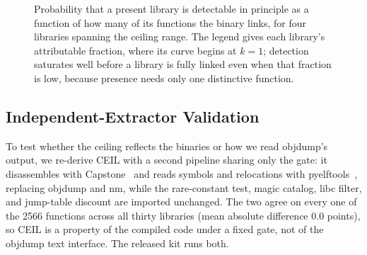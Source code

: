 \documentclass[conference]{IEEEtran}
\begin{document}
\begin{figure}[t]
\centering
{}
\caption{Probability that a present library is detectable in principle as a function
of how many of its functions the binary links, for four libraries spanning the ceiling
range. The legend gives each library's attributable fraction, where its curve begins
at $k=1$; detection saturates well before a library is fully linked even when that
fraction is low, because presence needs only one distinctive function.}
\label{fig:detect}
\end{figure}

\subsection{Independent-Extractor Validation}
\label{sec:validation}
To test whether the ceiling reflects the binaries or how we read objdump's output, we
re-derive CEIL with a second pipeline sharing only the gate: it disassembles with
Capstone~\cite{capstone} and reads symbols and relocations with
pyelftools~\cite{pyelftools}, replacing objdump and nm, while the rare-constant test,
magic catalog, libc filter, and jump-table discount are imported unchanged. The two
agree on every one of the 2566 functions across all thirty libraries (mean absolute
difference 0.0 points), so CEIL is a property of the compiled code under a fixed gate,
not of the objdump text interface. The released kit runs both.
\end{document}
